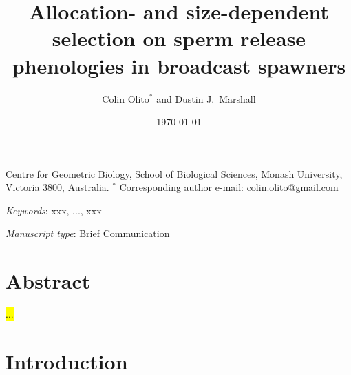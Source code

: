 \documentclass{article}
\title{Allocation- and size-dependent selection on sperm release phenologies in broadcast spawners}
\author{Colin Olito$^{\ast}$ and Dustin J.~Marshall}
\date{\today}
\begin{document}
\maketitle


\noindent{} Centre for Geometric Biology, School of Biological Sciences, Monash University, Victoria 3800, Australia.
\noindent{} $^\ast$ Corresponding author e-mail: colin.olito@gmail.com

\bigskip

\noindent{} \textit{Keywords}: xxx, ..., xxx

\bigskip

\noindent{} \textit{Manuscript type}: Brief Communication

\bigskip


\linenumbers
\modulolinenumbers[1]
\renewcommand\linenumberfont{\normalfont\small}


\newpage{}
\section*{Abstract}

\noindent{} \hl{...}

\section*{Introduction}
\end{document}
